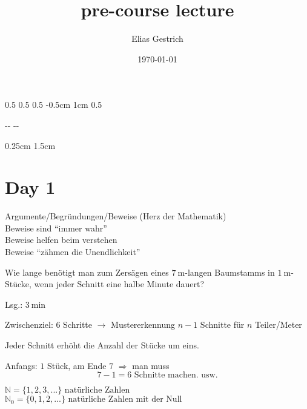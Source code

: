 \documentclass[a4paper]{article}
\title{pre-course lecture}
\author{Elias Gestrich}
\date{\today}
\newlength{\hmargin}
\newlength{\lmargin}
\newlength{\rmargin}
\newlength{\fmargin}
\begin{document}
\setlength{\hoffset}		{0.5\lmargin-1in}
\setlength{\voffset}		{0.5\hmargin-1in}
\setlength{\oddsidemargin}	{0.5\lmargin}
\setlength{\topmargin}		{-0.5cm}
\setlength{\headheight}		{1cm}
\setlength{\headsep}		{0.5\hmargin-0.5cm}

\setlength{\textheight}		{\paperheight-\hmargin-\fmargin}
\setlength{\textwidth}		{\paperwidth-\lmargin-\rmargin}
\setlength{\linewidth}		{\textwidth}
\setlength{\headwidth}		{\textwidth}

\setlength{\marginparsep}	{0.25cm}
\setlength{\marginparwidth}	{1.5cm}

\maketitle
\thispagestyle{empty}



\section{Day 1}
Argumente/Begründungen/Beweise (Herz der Mathematik)\\
Beweise sind ``immer wahr''\\
Beweise helfen beim verstehen\\
Beweise ``zähmen die Unendlichkeit''\par

\begin{problembox}
	Wie lange benötigt man zum Zersägen eines $\qty{7}{\meter}$-langen Baumstamms in $\qty{1}{\meter}$-Stücke, wenn jeder Schnitt eine halbe Minute dauert?\par
	Lsg.: $\qty{3}{\minute}$\par
	Zwischenziel: 6 Schritte $\rightarrow$ Mustererkennung $n-1$ Schnitte für $n$ Teiler/Meter\par
	\begin{proofbox}
		Jeder Schnitt erhöht die Anzahl der Stücke um eins.\par
		Anfangs: $1$ Stück, am Ende $7$ $\Rightarrow$ man muss \[7 - 1 = 6 \text{ Schnitte machen. usw.}\]
	\end{proofbox}
\end{problembox}

$\mathbb{N} = \{1, 2, 3, ...\} \text{ natürliche Zahlen}$\\
$\mathbb{N}_0 = \{0, 1, 2, ...\} \text{ natürliche Zahlen mit der Null}$\par
\end{document}
